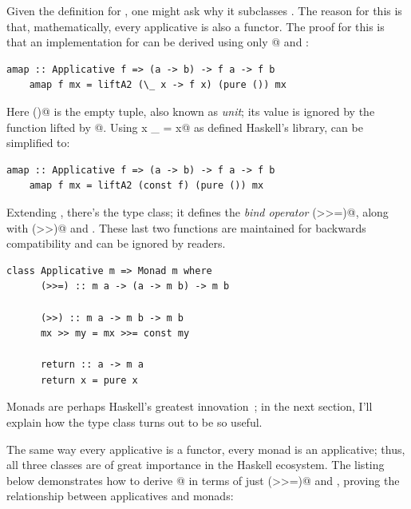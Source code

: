 \documentclass[UdineBachThesis,american,11pt]{PhdThesis}
\begin{document}
  Given the definition for \lstinline@Applicative@, one might ask why it
  subclasses \lstinline@Functor@. The reason for this is that, mathematically,
  every applicative is also a functor. The proof for this is that an
  implementation for \lstinline@fmap@ can be derived using only
  @ and \lstinline@pure@:

  \begin{lstlisting}[gobble=4,basicstyle=\ttfamily\small]
    amap :: Applicative f => (a -> b) -> f a -> f b
    amap f mx = liftA2 (\_ x -> f x) (pure ()) mx
  \end{lstlisting}

  Here \lstinline@()@ is the empty tuple, also known as \emph{unit}; its value
  is ignored by the function lifted by @. Using
  \lstinline@const x _ = x@ as defined Haskell's library, \lstinline@amap@ can
  be simplified to:

  \begin{lstlisting}[gobble=4,basicstyle=\ttfamily\small]
    amap :: Applicative f => (a -> b) -> f a -> f b
    amap f mx = liftA2 (const f) (pure ()) mx
  \end{lstlisting}

  Extending \lstinline@Applicative@, there's the \lstinline@Monad@ type class;
  it defines the \emph{bind operator} \lstinline@(>>=)@, along with
  \lstinline@(>>)@ and \lstinline@return@. These last two functions are
  maintained for backwards compatibility and can be ignored by readers.

  \begin{lstlisting}[gobble=4,basicstyle=\ttfamily\small]
    class Applicative m => Monad m where
      (>>=) :: m a -> (a -> m b) -> m b

      (>>) :: m a -> m b -> m b
      mx >> my = mx >>= const my

      return :: a -> m a
      return x = pure x
  \end{lstlisting}

  Monads are perhaps Haskell's greatest
  innovation~\cite{monads-for-functional-programming}; in the next section, I'll
  explain how the \lstinline@Monad@ type class turns out to be so useful.

  The same way every applicative is a functor, every monad is an applicative;
  thus, all three classes are of great importance in the Haskell ecosystem. The
  listing below demonstrates how to derive @ in terms of just
  \lstinline@(>>=)@ and \lstinline@return@, proving the relationship between
  applicatives and monads:
\end{document}
